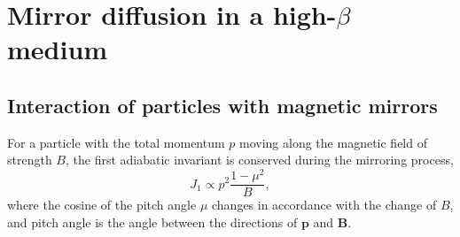 \documentclass[preprint2,twocolumn,times,tighten]{aastex63}
\begin{document}
\section{Mirror diffusion in a high-$\beta$ medium}

\subsection{Interaction of particles with magnetic mirrors}


For a particle with the total momentum $p$ moving along the magnetic field of strength $B$, the first adiabatic invariant is conserved during the mirroring process,
\begin{equation}
    J_1 \propto p^2\frac{1-\mu^2}{B},
    \label{J1}
\end{equation}
where the cosine of the pitch angle $\mu$ changes in accordance with the change of $B$, 
and pitch angle is the angle between the directions of ${\bm p}$ and ${\bm B}$. 
\end{document}
